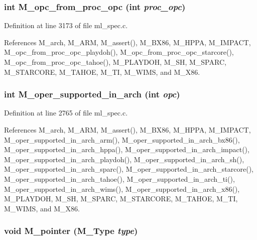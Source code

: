 \subsubsection{\setlength{\rightskip}{0pt plus 5cm}int M\_\-opc\_\-from\_\-proc\_\-opc (int {\em proc\_\-opc})}\label{ml__spec_8c_15b4261108781b5e726358c1d2908c73}




Definition at line 3173 of file ml\_\-spec.c.

References M\_\-arch, M\_\-ARM, M\_\-assert(), M\_\-BX86, M\_\-HPPA, M\_\-IMPACT, M\_\-opc\_\-from\_\-proc\_\-opc\_\-playdoh(), M\_\-opc\_\-from\_\-proc\_\-opc\_\-starcore(), M\_\-opc\_\-from\_\-proc\_\-opc\_\-tahoe(), M\_\-PLAYDOH, M\_\-SH, M\_\-SPARC, M\_\-STARCORE, M\_\-TAHOE, M\_\-TI, M\_\-WIMS, and M\_\-X86.
\subsubsection{\setlength{\rightskip}{0pt plus 5cm}int M\_\-oper\_\-supported\_\-in\_\-arch (int {\em opc})}\label{ml__spec_8c_cb7ed137027d04e77a3c4f746a37c9e1}




Definition at line 2765 of file ml\_\-spec.c.

References M\_\-arch, M\_\-ARM, M\_\-assert(), M\_\-BX86, M\_\-HPPA, M\_\-IMPACT, M\_\-oper\_\-supported\_\-in\_\-arch\_\-arm(), M\_\-oper\_\-supported\_\-in\_\-arch\_\-bx86(), M\_\-oper\_\-supported\_\-in\_\-arch\_\-hppa(), M\_\-oper\_\-supported\_\-in\_\-arch\_\-impact(), M\_\-oper\_\-supported\_\-in\_\-arch\_\-playdoh(), M\_\-oper\_\-supported\_\-in\_\-arch\_\-sh(), M\_\-oper\_\-supported\_\-in\_\-arch\_\-sparc(), M\_\-oper\_\-supported\_\-in\_\-arch\_\-starcore(), M\_\-oper\_\-supported\_\-in\_\-arch\_\-tahoe(), M\_\-oper\_\-supported\_\-in\_\-arch\_\-ti(), M\_\-oper\_\-supported\_\-in\_\-arch\_\-wims(), M\_\-oper\_\-supported\_\-in\_\-arch\_\-x86(), M\_\-PLAYDOH, M\_\-SH, M\_\-SPARC, M\_\-STARCORE, M\_\-TAHOE, M\_\-TI, M\_\-WIMS, and M\_\-X86.
\subsubsection{\setlength{\rightskip}{0pt plus 5cm}void M\_\-pointer (\bf{M\_\-Type} {\em type})}\label{ml__spec_8c_5062b86f17dd667ea4c82e7bec27ddb0}




